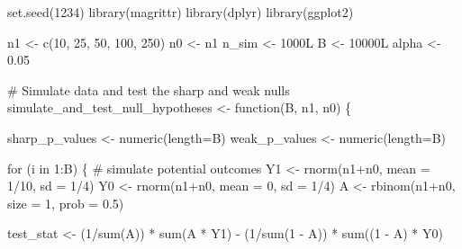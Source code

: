 \documentclass[
  letterpaper,
  DIV=11,
  numbers=noendperiod]{scrartcl}
\newenvironment{Shaded}{\begin{snugshade}}{\end{snugshade}}
\newcommand{\AttributeTok}[1]{\textcolor[rgb]{0.40,0.45,0.13}{#1}}
\newcommand{\CommentTok}[1]{\textcolor[rgb]{0.37,0.37,0.37}{#1}}
\newcommand{\ControlFlowTok}[1]{\textcolor[rgb]{0.00,0.23,0.31}{#1}}
\newcommand{\DecValTok}[1]{\textcolor[rgb]{0.68,0.00,0.00}{#1}}
\newcommand{\FloatTok}[1]{\textcolor[rgb]{0.68,0.00,0.00}{#1}}
\newcommand{\FunctionTok}[1]{\textcolor[rgb]{0.28,0.35,0.67}{#1}}
\newcommand{\NormalTok}[1]{\textcolor[rgb]{0.00,0.23,0.31}{#1}}
\newcommand{\OtherTok}[1]{\textcolor[rgb]{0.00,0.23,0.31}{#1}}
\newcommand{\SpecialCharTok}[1]{\textcolor[rgb]{0.37,0.37,0.37}{#1}}
\begin{document}
\begin{Shaded}
\begin{Highlighting}[]
\FunctionTok{set.seed}\NormalTok{(}\DecValTok{1234}\NormalTok{)}
\FunctionTok{library}\NormalTok{(magrittr)}
\FunctionTok{library}\NormalTok{(dplyr)}
\FunctionTok{library}\NormalTok{(ggplot2)}

\NormalTok{n1 }\OtherTok{\textless{}{-}} \FunctionTok{c}\NormalTok{(}\DecValTok{10}\NormalTok{, }\DecValTok{25}\NormalTok{, }\DecValTok{50}\NormalTok{, }\DecValTok{100}\NormalTok{, }\DecValTok{250}\NormalTok{)}
\NormalTok{n0 }\OtherTok{\textless{}{-}}\NormalTok{ n1}
\NormalTok{n\_sim }\OtherTok{\textless{}{-}}\NormalTok{ 1000L}
\NormalTok{B }\OtherTok{\textless{}{-}}\NormalTok{ 10000L}
\NormalTok{alpha }\OtherTok{\textless{}{-}} \FloatTok{0.05}

\CommentTok{\# Simulate data and test the sharp and weak nulls}
\NormalTok{simulate\_and\_test\_null\_hypotheses }\OtherTok{\textless{}{-}} \ControlFlowTok{function}\NormalTok{(B, n1, n0) \{}

\NormalTok{  sharp\_p\_values }\OtherTok{\textless{}{-}} \FunctionTok{numeric}\NormalTok{(}\AttributeTok{length=}\NormalTok{B) }
\NormalTok{  weak\_p\_values }\OtherTok{\textless{}{-}} \FunctionTok{numeric}\NormalTok{(}\AttributeTok{length=}\NormalTok{B) }

  \ControlFlowTok{for}\NormalTok{ (i }\ControlFlowTok{in} \DecValTok{1}\SpecialCharTok{:}\NormalTok{B) \{}
    \CommentTok{\# simulate potential outcomes}
\NormalTok{    Y1 }\OtherTok{\textless{}{-}} \FunctionTok{rnorm}\NormalTok{(n1}\SpecialCharTok{+}\NormalTok{n0, }\AttributeTok{mean =} \DecValTok{1}\SpecialCharTok{/}\DecValTok{10}\NormalTok{, }\AttributeTok{sd =} \DecValTok{1}\SpecialCharTok{/}\DecValTok{4}\NormalTok{)}
\NormalTok{    Y0 }\OtherTok{\textless{}{-}} \FunctionTok{rnorm}\NormalTok{(n1}\SpecialCharTok{+}\NormalTok{n0, }\AttributeTok{mean =} \DecValTok{0}\NormalTok{, }\AttributeTok{sd =} \DecValTok{1}\SpecialCharTok{/}\DecValTok{4}\NormalTok{)}
\NormalTok{    A }\OtherTok{\textless{}{-}} \FunctionTok{rbinom}\NormalTok{(n1}\SpecialCharTok{+}\NormalTok{n0, }\AttributeTok{size =} \DecValTok{1}\NormalTok{, }\AttributeTok{prob =} \FloatTok{0.5}\NormalTok{)}

\NormalTok{    test\_stat }\OtherTok{\textless{}{-}}\NormalTok{ (}\DecValTok{1}\SpecialCharTok{/}\FunctionTok{sum}\NormalTok{(A)) }\SpecialCharTok{*} \FunctionTok{sum}\NormalTok{(A }\SpecialCharTok{*}\NormalTok{ Y1) }\SpecialCharTok{{-}} 
\NormalTok{      (}\DecValTok{1}\SpecialCharTok{/}\FunctionTok{sum}\NormalTok{(}\DecValTok{1} \SpecialCharTok{{-}}\NormalTok{ A)) }\SpecialCharTok{*} \FunctionTok{sum}\NormalTok{((}\DecValTok{1} \SpecialCharTok{{-}}\NormalTok{ A) }\SpecialCharTok{*}\NormalTok{ Y0) }


\end{Highlighting}
\end{Shaded}
\end{document}
